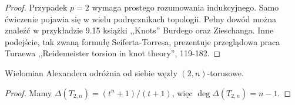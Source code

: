 \begin{proof}
    Przypadek $p = 2$ wymaga prostego rozumowania indukcyjnego.
    Samo ćwiczenie pojawia się w wielu podręcznikach topologii.
    Pełny dowód można znaleźć w przykładzie 9.15 książki ,,Knots'' Burdego oraz Zieschanga.
    Inne podejście, tak zwaną formułę Seiferta-Torresa, prezentuje przeglądowa praca Turaewa ,,Reidemeister torsion in knot theory'', 119-182.
\end{proof}

\begin{corollary}
    Wielomian Alexandera odróżnia od siebie węzły $(2,n)$-torusowe.
\end{corollary}

\begin{proof}
    Mamy $\Delta(T_{2,n}) = (t^n+1) / (t+1)$, więc $\deg \Delta (T_{2,n}) = n - 1$.
\end{proof}

